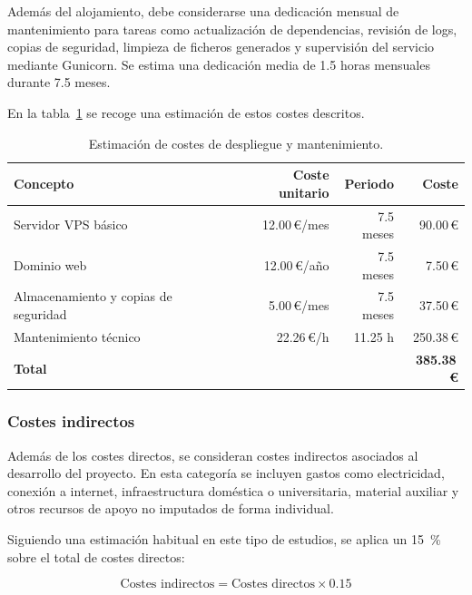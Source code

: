 Además del alojamiento, debe considerarse una dedicación mensual de mantenimiento para tareas como actualización de dependencias, revisión de logs, copias de seguridad, limpieza de ficheros generados y supervisión del servicio mediante Gunicorn. Se estima una dedicación media de \num{1.5} horas mensuales durante \num{7.5} meses.

En la tabla~\ref{tab:costes_despliegue} se recoge una estimación de estos costes descritos.

\begin{table}[]
	\centering
	\renewcommand{\arraystretch}{1.25}
	\begin{tabular}{p{5cm} r r r}
		\toprule
		\textbf{Concepto} & \textbf{Coste unitario} & \textbf{Periodo} & \textbf{Coste} \\
		\midrule
		Servidor VPS básico & \num{12.00}\,€/mes & \num{7.5} meses & \num{90.00}\,€ \\
		Dominio web & \num{12.00}\,€/año & \num{7.5} meses & \num{7.50}\,€ \\
		Almacenamiento y copias de seguridad & \num{5.00}\,€/mes & \num{7.5} meses & \num{37.50}\,€ \\
		Mantenimiento técnico & \num{22.26}\,€/h & \num{11.25} h & \num{250.38}\,€ \\
		\midrule
		\textbf{Total} & & & \textbf{\num{385.38}\,€} \\
		\bottomrule
	\end{tabular}
	\caption{Estimación de costes de despliegue y mantenimiento.}
	\label{tab:costes_despliegue}
\end{table}

\subsubsection{Costes indirectos}

Además de los costes directos, se consideran costes indirectos asociados al desarrollo del proyecto. En esta categoría se incluyen gastos como electricidad, conexión a internet, infraestructura doméstica o universitaria, material auxiliar y otros recursos de apoyo no imputados de forma individual.

Siguiendo una estimación habitual en este tipo de estudios, se aplica un \qty{15}{\percent} sobre el total de costes directos:

\begin{equation}
	\text{Costes indirectos} =
	\text{Costes directos} \times \num{0.15}
\end{equation}

